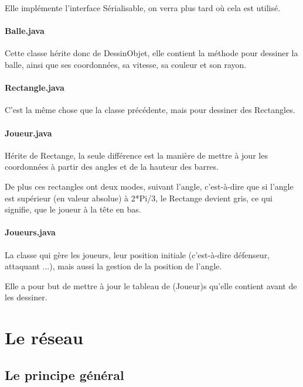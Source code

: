 \documentclass[a4paper,12pt]{report}
\begin{document}
Elle implémente l'interface Sérialisable, on verra plus tard où cela est utilisé.

\paragraph{Balle.java}

Cette classe hérite donc de DessinObjet, elle contient la méthode pour dessiner la balle, ainsi que ses coordonnées, sa vitesse, sa couleur et son rayon. 

\paragraph{Rectangle.java}

C'est la même chose que la classe précédente, mais pour dessiner des Rectangles.

\paragraph{Joueur.java}

Hérite de Rectange, la seule différence est la manière de mettre à jour les coordonnées à partir des angles et de la hauteur des barres.

De plus ces rectangles ont deux modes, suivant l'angle, c'est-à-dire que si l'angle est supérieur (en valeur absolue) à 2*Pi/3, le Rectange devient gris, ce qui signifie, que le joueur à la tête en bas.

\paragraph{Joueurs.java}

La classe qui gère les joueurs, leur position initiale (c'est-à-dire défenseur, attaquant ...), mais aussi la gestion de la position de l'angle.

Elle a pour but de mettre à jour le tableau de (Joueur)s qu'elle contient avant de les dessiner.







\section{Le réseau}

\subsection{Le principe général}
\end{document}
